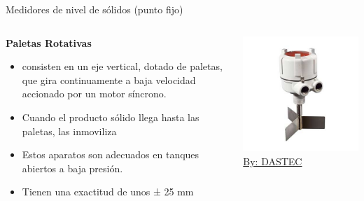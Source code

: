 \documentclass[aspectratio=169]{beamer}
\begin{document}
\begin{frame}{Medidores de nivel de sólidos (punto fijo)}
    \begin{columns}[c, onlytextwidth]
        \begin{column}{0.45\textwidth}
        \textbf{Paletas Rotativas}
            \begin{itemize}
                \item consisten en un eje vertical, dotado de paletas, que gira continuamente a baja velocidad accionado por un motor síncrono.
                \item Cuando el producto sólido llega hasta las paletas, las inmoviliza
                \item Estos aparatos son adecuados en tanques abiertos a baja presión.
                \item Tienen una exactitud de unos ± 25 mm
            \end{itemize}
        \end{column}
        \begin{column}{0.50\textwidth}
        \centering
            \includegraphics[width = 0.9\linewidth]{fig/Nivel/PaletaRotativa.jpg}\\
            \tiny{\href{https://www.dastecsrl.com.ar/divisiones/caudal-nivel-presion-humedad-y-pesaje/nivel-puntual/paleta-rotativa/bmrx-detector-de-nivel-por-paleta-rotativa-para-solidos}{By: DASTEC}}
        \end{column}
    \end{columns}
\end{frame}
\end{document}

